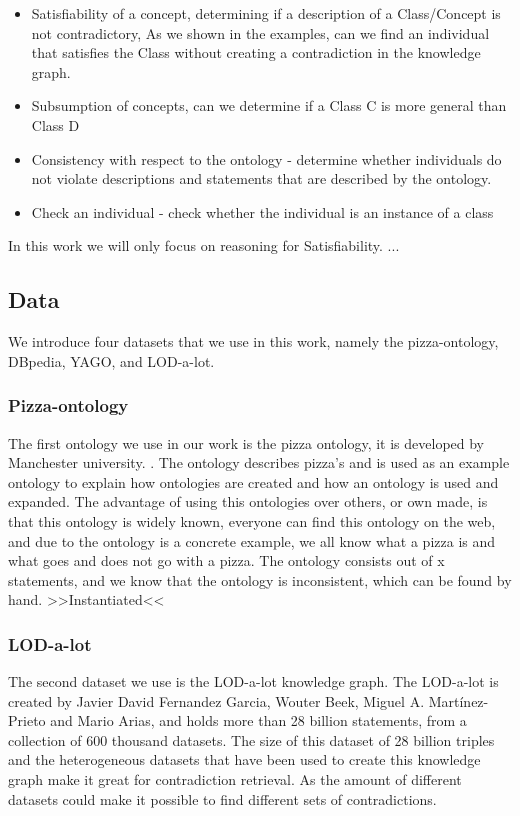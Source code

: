 \documentclass{article}
\begin{document}
\begin{itemize}
	\item Satisfiability of a concept, determining if a description of a Class/Concept is not contradictory, As we shown in the examples, can we find an individual that satisfies the Class without creating a contradiction in the knowledge graph. 
	\item Subsumption of concepts, can we determine if a Class C is more general than Class D
	\item Consistency with respect to the ontology - determine whether individuals do not violate descriptions and statements that are described by the ontology.
 	\item Check an individual - check whether the individual is an instance of a class
\end{itemize}

In this work we will only focus on reasoning for Satisfiability. ...

\subsection{Data}
We introduce four datasets that we use in this work, namely the pizza-ontology, DBpedia, YAGO, and LOD-a-lot.

\subsubsection{Pizza-ontology}
The first ontology we use in our work is the pizza ontology, it is developed by Manchester university. \cite{pizza}. The ontology describes pizza's and is used as an example ontology to explain how ontologies are created and how an ontology is used and expanded. The advantage of using this ontologies over others, or own made, is that this ontology is widely known, everyone can find this ontology on the web, and due to the ontology is a concrete example, we all know what a pizza is and what goes and does not go with a pizza. 
The ontology consists out of x statements, and we know that the ontology is inconsistent, which can be found by hand.
>>Instantiated<<

\subsubsection{LOD-a-lot}
The second dataset we use is the LOD-a-lot\cite{JavierD:2017} knowledge graph. The LOD-a-lot is created by Javier David Fernandez Garcia, Wouter Beek, Miguel A. Martínez-Prieto and Mario Arias, and holds more than 28 billion statements, from a collection of 600 thousand datasets. The size of this dataset of 28 billion triples and the heterogeneous datasets that have been used to create this knowledge graph make it great for contradiction retrieval. As the amount of different datasets could make it possible to find different sets of contradictions.
\end{document}
